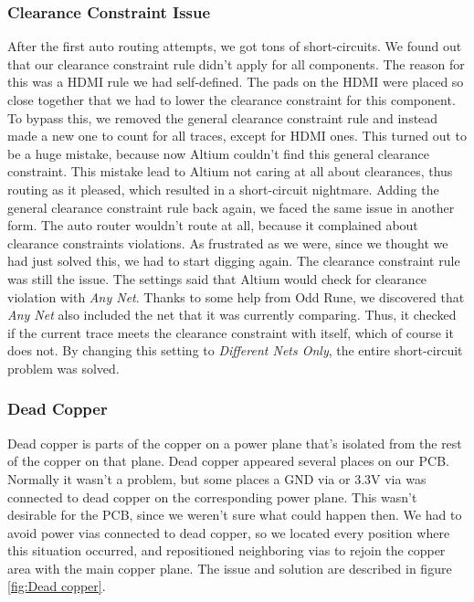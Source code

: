 \begin{itemize}
\subsubsection{Clearance Constraint Issue}
After the first auto routing attempts, we got tons of short-circuits. We found out that our clearance constraint rule didn't apply for all components. The reason for this was a HDMI rule we had self-defined. The pads on the HDMI were placed so close together that we had to lower the clearance constraint for this component. To bypass this, we removed the general clearance constraint rule and instead made a new one to count for all traces, except for HDMI ones. This turned out to be a huge mistake, because now Altium couldn't find this general clearance constraint. This mistake lead to Altium not caring at all about clearances, thus routing as it pleased, which resulted in a short-circuit nightmare.
\newline
\newline
Adding the general clearance constraint rule back again, we faced the same issue in another form. The auto router wouldn't route at all, because it complained about clearance constraints violations. As frustrated as we were, since we thought we had just solved this, we had to start digging again. 
\newline
The clearance constraint rule was still the issue. The settings said that Altium would check for clearance violation with \emph{Any Net}. Thanks to some help from Odd Rune, we discovered that \emph{Any Net} also included the net that it was currently comparing. Thus, it checked if the current trace meets the clearance constraint with itself, which of course it does not. By changing this setting to \emph{Different Nets Only}, the entire short-circuit problem was solved. 

\subsubsection{Dead Copper}
Dead copper is parts of the copper on a power plane that's isolated from the rest of the copper on that plane. 
Dead copper appeared several places on our PCB. Normally it wasn't a problem, but some places a GND via or 3.3V via was connected to dead copper on the corresponding power plane. This wasn't desirable for the PCB, since we weren't sure what could happen then. 
\newline
We had to avoid power vias connected to dead copper, so we located every position where this situation occurred, and repositioned neighboring vias to rejoin the copper area with the main copper plane. The issue and solution are described in figure \ref{fig:Dead copper}.


\end{itemize}
